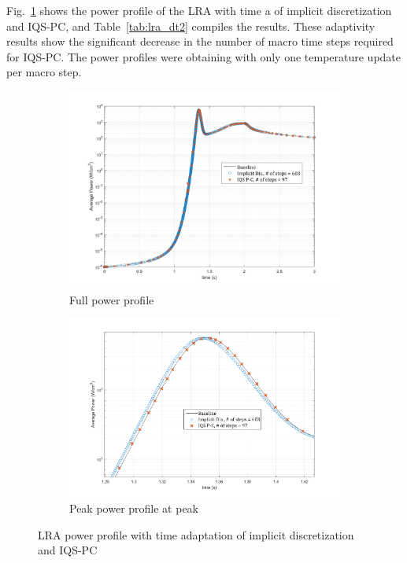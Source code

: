 \documentclass{elsarticle}
\newcommand{\fig}[1]{Fig.~\ref{#1}}                      %
\newcommand{\tbl}[1]{Table~\ref{#1}}                     %
\newcommand{\iqspc}{IQS-PC\xspace}
\begin{document}
\fig{fig:lra_dt2} shows the power profile of the LRA with time a of implicit discretization and \iqspc, and \tbl{tab:lra_dt2} compiles the results. These adaptivity results show the significant decrease in the number of macro time steps required for \iqspc. The power profiles were obtaining with only one temperature update per macro step.

\begin{figure}[!htbp]
\centering
\begin{subfigure}[!htbp]{0.49\textwidth}
\includegraphics[width=\textwidth]{figures/LRA_DT2.png}
\caption{Full power profile}
\end{subfigure}
\begin{subfigure}[!htbp]{0.49\textwidth}
\includegraphics[width=\textwidth]{figures/LRA_DT2_peak.png}
\caption{Peak power profile at peak}
\end{subfigure}
\caption{LRA power profile with time adaptation of implicit discretization and \iqspc}
\label{fig:lra_dt2}
\end{figure}
\end{document}
